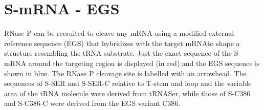 \documentclass[twoside,a4paper]{report}
\begin{document}
\clearpage
	\section{S-mRNA - EGS }
	
	 RNase P can be recruited to cleave any mRNA using a modified external reference sequence (EGS) that hybridizes with the target mRNAto shape a structure resembling the tRNA substrate. Just the exact sequence of the S mRNA around the targeting region is displayed (in red) and the EGS sequence is shown in blue. The RNase P cleavage site is labelled with an arrowhead. The sequences of S-SER and S-SER-C relative to T-stem and loop and the variable area of the tRNA molecule were derived from tRNASer, while those of S-C386 and S-C386-C were derived from the EGS variant C386.\\
\end{document}
